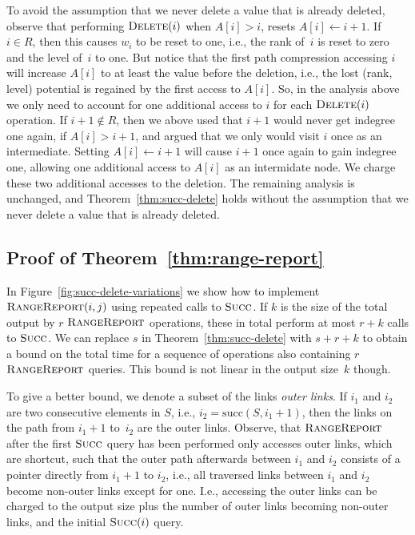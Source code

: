 \documentclass[a4paper]{lipics-v2021}
\newcommand{\successor}{\mathrm{succ}}
\newcommand{\FuncName}[1]{\textup{\textsc{#1}}}
\newcommand{\Delete}{\FuncName{Delete}}
\newcommand{\Succ}{\FuncName{Succ}}
\newcommand{\RangeReport}{\FuncName{RangeReport}}
\begin{document}
To avoid the assumption that we never delete a value that is already deleted, observe that performing $\Delete(i)$ when $A[i]>i$, resets $A[i] \leftarrow i+1$. If $i \in R$, then this causes $w_i$ to be reset to one, i.e., the rank of~$i$ is reset to zero and the level of~$i$ to one. But notice that the first path compression accessing $i$ will increase $A[i]$ to at least the value before the deletion, i.e., the lost (rank, level) potential is regained by the first access to $A[i]$. So, in the analysis above we only need to account for one additional access to $i$ for each $\Delete(i)$ operation. If $i+1\notin R$, then we above used that $i+1$ would never get indegree one again, if $A[i]>i+1$, and argued that we only would visit $i$ once as an intermediate. Setting $A[i] \leftarrow i+1$ will cause $i+1$ once again to gain indegree one, allowing one additional access to $A[i]$ as an intermidate node. We charge these two additional accesses to the deletion. The remaining analysis is unchanged, and Theorem~\ref{thm:succ-delete} holds without the assumption that we never delete a value that is already deleted.

\subsection{Proof of Theorem~\ref{thm:range-report}}

In Figure~\ref{fig:succ-delete-variations} we show how to implement $\RangeReport(i,j)$ using repeated calls to $\Succ$. If $k$ is the size of the total output by $r$ $\RangeReport$ operations, these in total perform at most $r+k$ calls to $\Succ$. We can replace $s$ in Theorem~\ref{thm:succ-delete} with $s+r+k$ to obtain a bound on the total time for a sequence of operations also containing $r$ $\RangeReport$ queries. This bound is not linear in the output size~$k$ though.

To give a better bound, we denote a subset of the links \emph{outer links}. If $i_1$ and $i_2$ are two consecutive elements in $S$, i.e., $i_2=\successor(S,i_1+1)$, then the links on the path from $i_1+1$ to~$i_2$ are the outer links. Observe, that $\RangeReport$ after the first $\Succ$ query has been performed only accesses outer links, which are shortcut, such that the outer path afterwards between $i_1$ and $i_2$ consists of a pointer directly from $i_1+1$ to $i_2$, i.e., all traversed links between $i_1$ and $i_2$ become non-outer links except for one. I.e., accessing the outer links can be charged to the output size plus the number of outer links becoming non-outer links, and the initial $\Succ(i)$ query.
\end{document}
